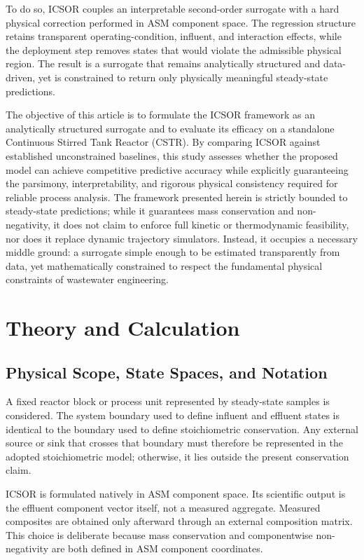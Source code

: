 \documentclass[11pt]{article}
\begin{document}
To do so, ICSOR couples an interpretable second-order surrogate with a hard physical correction performed in ASM component space. The regression structure retains transparent operating-condition, influent, and interaction effects, while the deployment step removes states that would violate the admissible physical region. The result is a surrogate that remains analytically structured and data-driven, yet is constrained to return only physically meaningful steady-state predictions.

The objective of this article is to formulate the ICSOR framework as an analytically structured surrogate and to evaluate its efficacy on a standalone Continuous Stirred Tank Reactor (CSTR). By comparing ICSOR against established unconstrained baselines, this study assesses whether the proposed model can achieve competitive predictive accuracy while explicitly guaranteeing the parsimony, interpretability, and rigorous physical consistency required for reliable process analysis. The framework presented herein is strictly bounded to steady-state predictions; while it guarantees mass conservation and non-negativity, it does not claim to enforce full kinetic or thermodynamic feasibility, nor does it replace dynamic trajectory simulators. Instead, it occupies a necessary middle ground: a surrogate simple enough to be estimated transparently from data, yet mathematically constrained to respect the fundamental physical constraints of wastewater engineering.

\section{Theory and Calculation}

\subsection{Physical Scope, State Spaces, and Notation}

A fixed reactor block or process unit represented by steady-state samples is considered. The system boundary used to define influent and effluent states is identical to the boundary used to define stoichiometric conservation. Any external source or sink that crosses that boundary must therefore be represented in the adopted stoichiometric model; otherwise, it lies outside the present conservation claim.

ICSOR is formulated natively in ASM component space. Its scientific output is the effluent component vector itself, not a measured aggregate. Measured composites are obtained only afterward through an external composition matrix. This choice is deliberate because mass conservation and componentwise non-negativity are both defined in ASM component coordinates.
\end{document}
